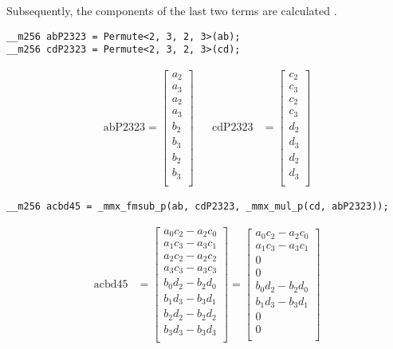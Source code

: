 Subsequently, the components of the last two terms are calculated .

\begin{verbatim}
__m256 abP2323 = Permute<2, 3, 2, 3>(ab);
__m256 cdP2323 = Permute<2, 3, 2, 3>(cd);
\end{verbatim}
\begin{align*}
\mathrm{abP2323} 
=
\begin{bmatrix}
a_2\\
a_3\\
a_2\\
a_3\\
b_2\\
b_3\\
b_2\\
b_3\\
\end{bmatrix}
&&
\mathrm{cdP2323} 
&=
\begin{bmatrix}
c_2\\
c_3\\
c_2\\
c_3\\
d_2\\
d_3\\
d_2\\
d_3\\
\end{bmatrix}
\end{align*}


\begin{verbatim}
__m256 acbd45 = _mmx_fmsub_p(ab, cdP2323, _mmx_mul_p(cd, abP2323));
\end{verbatim}
\begin{align*}
\mathrm{acbd45} 
&=
\begin{bmatrix}
a_0c_2 - a_2c_0\\
a_1c_3 - a_3c_1\\
a_2c_2 - a_2c_2\\
a_3c_3 - a_3c_3\\
b_0d_2 - b_2d_0\\
b_1d_3 - b_3d_1\\
b_2d_2 - b_2d_2\\
b_3d_3 - b_3d_3\\
\end{bmatrix}
=
\begin{bmatrix}
a_0c_2 - a_2c_0\\
a_1c_3 - a_3c_1\\
0\\
0\\
b_0d_2 - b_2d_0\\
b_1d_3 - b_3d_1\\
0\\
0\\
\end{bmatrix}
\end{align*}


